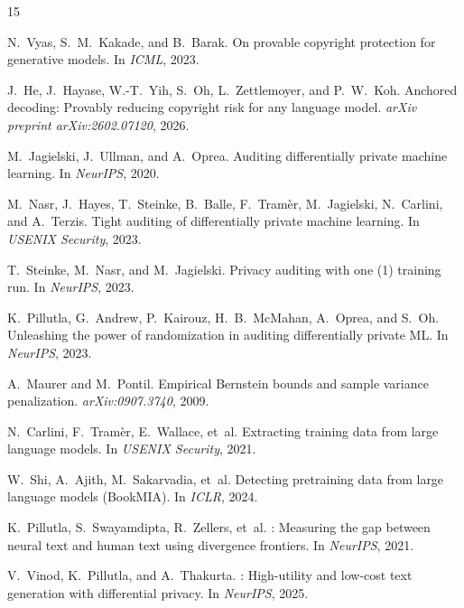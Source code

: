 \documentclass{article}
\begin{document}
\begin{thebibliography}{15}

N.~Vyas, S.~M.~Kakade, and B.~Barak.
\newblock On provable copyright protection for generative models.
\newblock In \emph{ICML}, 2023.

J.~He, J.~Hayase, W.-T.~Yih, S.~Oh, L.~Zettlemoyer, and P.~W.~Koh.
\newblock Anchored decoding: Provably reducing copyright risk for any language model.
\newblock \emph{arXiv preprint arXiv:2602.07120}, 2026.

M.~Jagielski, J.~Ullman, and A.~Oprea.
\newblock Auditing differentially private machine learning.
\newblock In \emph{NeurIPS}, 2020.

M.~Nasr, J.~Hayes, T.~Steinke, B.~Balle, F.~Tram\`er, M.~Jagielski, N.~Carlini, and A.~Terzis.
\newblock Tight auditing of differentially private machine learning.
\newblock In \emph{USENIX Security}, 2023.

T.~Steinke, M.~Nasr, and M.~Jagielski.
\newblock Privacy auditing with one (1) training run.
\newblock In \emph{NeurIPS}, 2023.

K.~Pillutla, G.~Andrew, P.~Kairouz, H.~B.~McMahan, A.~Oprea, and S.~Oh.
\newblock Unleashing the power of randomization in auditing differentially private {ML}.
\newblock In \emph{NeurIPS}, 2023.

A.~Maurer and M.~Pontil.
\newblock Empirical {B}ernstein bounds and sample variance penalization.
\newblock \emph{arXiv:0907.3740}, 2009.

N.~Carlini, F.~Tram\`er, E.~Wallace, et~al.
\newblock Extracting training data from large language models.
\newblock In \emph{USENIX Security}, 2021.

W.~Shi, A.~Ajith, M.~Sakarvadia, et~al.
\newblock Detecting pretraining data from large language models ({BookMIA}).
\newblock In \emph{ICLR}, 2024.

K.~Pillutla, S.~Swayamdipta, R.~Zellers, et~al.
: Measuring the gap between neural text and human text using divergence frontiers.
\newblock In \emph{NeurIPS}, 2021.

V.~Vinod, K.~Pillutla, and A.~Thakurta.
: High-utility and low-cost text generation with differential privacy.
\newblock In \emph{NeurIPS}, 2025.


\end{thebibliography}
\end{document}
